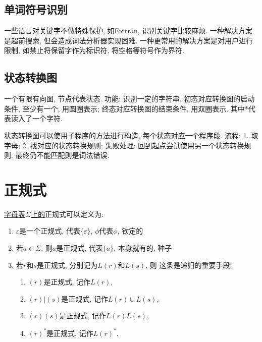     \subsection{单词符号识别}

        一些语言对关键字不做特殊保护, 如Fortran, 识别关键字比较麻烦. 一种解决方案是\textsf{超前搜索}, 但会造成词法分析器实现困难. 一种更常用的解决方案是对用户进行限制, 如禁止将保留字作为标识符, 将空格等符号作为界符.

    \subsection{状态转换图}

        一个有限有向图, 节点代表状态. 功能: 识别一定的字符串. \textsf{初态}对应转换图的启动条件, 至少有一个, 用圆圈表示; \textsf{终态}对应转换图的结束条件, 用双圈表示. 其中*代表读入了一个字符.
    
        状态转换图可以使用子程序的方法进行构造, 每个状态对应一个程序段. 流程: 1. 取字母; 2. 找对应的状态转换规则; 失败处理: 回到起点尝试使用另一个状态转换规则. 最终仍不能匹配则是词法错误.

\section{正规式}

    \uline{字母表$\Sigma$上的}正规式可以定义为:

    \begin{enumerate}
        \item $\varepsilon$是一个正规式, 代表$\{\varepsilon\}$, $\phi$代表$\phi$, \hfill 钦定的
        \item 若$a\in\Sigma$, 则$a$是正规式, 代表$\{a\}$, \hfill 本身就有的, 种子
        \item 若$r$和$s$是正规式, 分别记为$L(r)$和$L(s)$, 则 \hfill 这条是递归的重要手段!
            \begin{enumerate}
                \item $(r)$是正规式, 记作$L(r)$,
                \item $(r)|(s)$是正规式, 记作$L(r)\cup L(s)$,
                \item $(r)(s)$是正规式, 记作$L(r)L(s)$,
                \item $(r)^*$是正规式, 记作$L(r)^*$.
            \end{enumerate}
    \end{enumerate}

